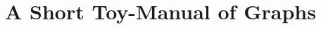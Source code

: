 \documentclass[../../deep-dive]{subfiles}
\begin{document}
\chapter{A Short Toy-Manual of Graphs}






\end{document}
